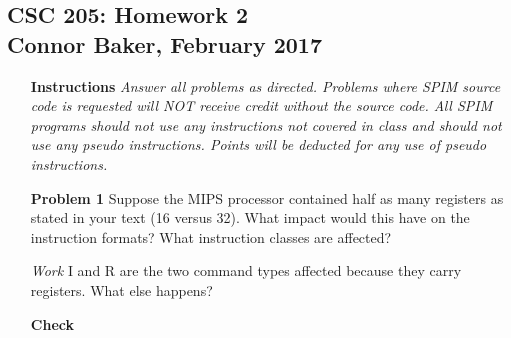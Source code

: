 \documentclass[12pt]{article}
\begin{document}
\begin{center}
  \subsection*{CSC 205: Homework 2\\Connor Baker, February 2017}
\end{center}
\begin{enumerate}
  \item[\textbf{Instructions}] \textit{Answer all problems as directed.  Problems where SPIM source code is requested will NOT receive credit without the source code.  All SPIM programs should not use any instructions not covered in class and should not use any pseudo instructions.  Points will be deducted for any use of pseudo instructions.}
\end{enumerate}

\begin{enumerate}
  \item[\textbf{Problem 1}] Suppose the MIPS processor contained half as many registers as stated in your text (16 versus 32).  What impact would this have on the instruction formats?  What instruction classes are affected?
\end{enumerate}

\begin{enumerate}
  \item[\textit{Work}] I and R are the two command types affected because they carry registers. What else happens?
  \item[\textbf{Check}]
\end{enumerate}
\end{document}
